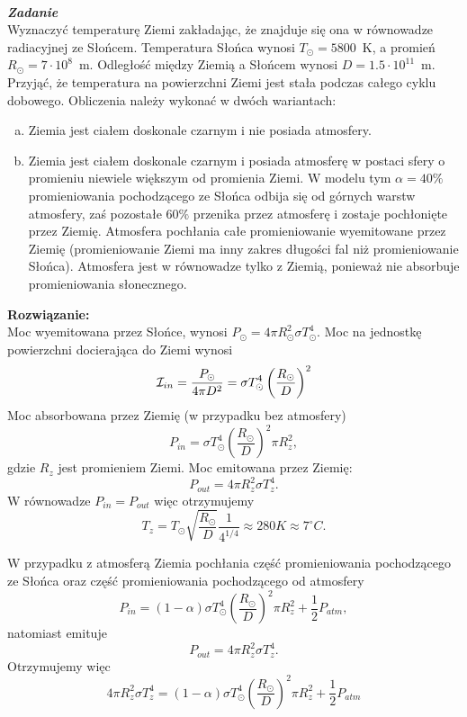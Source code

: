 \documentclass[11pt,a4paper]{article}
\newcounter{zadanie}\newcommand{\zadanie}[1][]{\addtocounter{zadanie}{1} ~\\  {\bf \emph{Zadanie \arabic{zadanie} #1 }} \\}
\begin{document}
\newpage
\zadanie

Wyznaczyć temperaturę Ziemi zakładając, że znajduje się ona w równowadze radiacyjnej ze
Słońcem. Temperatura Słońca wynosi $T_\odot = 5800$~K, a promień $R_\odot = 7 \cdot 10^8$~m.
Odległość między Ziemią a Słońcem wynosi $D = 1.5 \cdot 10^{11}$~m. 
Przyjąć, że temperatura na powierzchni Ziemi jest stała podczas całego cyklu dobowego.
Obliczenia należy wykonać w dwóch wariantach:\\
\begin{enumerate}[a)]
        \item Ziemia jest ciałem doskonale czarnym i nie posiada atmosfery.
        \item Ziemia jest ciałem doskonale czarnym i posiada atmosferę w postaci sfery o promieniu niewiele większym od promienia Ziemi. 
        W modelu tym $\alpha=40\%$ promieniowania pochodzącego ze Słońca odbija się od górnych warstw atmosfery, zaś pozostałe $60\%$ 
        przenika przez atmosferę i zostaje pochłonięte przez Ziemię. Atmosfera pochłania całe promieniowanie wyemitowane przez Ziemię
  (promieniowanie Ziemi ma inny zakres długości fal niż promieniowanie Słońca). Atmosfera jest w równowadze tylko z Ziemią, 
  ponieważ nie absorbuje promieniowania słonecznego.
\end{enumerate}

\vskip 10pt
\textbf{Rozwiązanie:}\\
Moc wyemitowana przez Słońce, wynosi
$P_\odot = 4\pi R_\odot^2 \sigma T_\odot^4 $. Moc na jednostkę powierzchni docierająca
do Ziemi wynosi 
$$
{\cal I}_{in} = \frac{P_\odot}{ 4\pi D^2} =  \sigma T_\odot^4 \left(\frac{R_\odot}{D}\right)^2
$$
Moc absorbowana przez Ziemię (w przypadku bez atmosfery)
$$
P_{in} =  \sigma T_\odot^4 \left(\frac{R_\odot}{D}\right)^2 \pi R_z ^2,
$$
gdzie $R_z$ jest promieniem Ziemi.
Moc emitowana przez Ziemię:
$$
P_{out} = 4\pi R_z^2 \sigma T_z^4.
$$
W równowadze $P_{in}=P_{out}$ więc otrzymujemy
$$
T_z = T_\odot \sqrt{\frac{R_\odot}{ D}}\frac{1}{4^{1/4}} \approx 280 K \approx 7^\circ C.
$$

W przypadku z atmosferą 
Ziemia pochłania część promieniowania pochodzącego ze Słońca oraz część promieniowania 
pochodzącego od atmosfery 
$$
P_{in} = (1-\alpha)\sigma T_\odot^4 \left(\frac{R_\odot}{D}\right)^2 \pi R_z ^2
+ \frac{1}{2} P_{atm},
$$
natomiast emituje
$$
P_{out} = 4\pi R_z^2 \sigma T_z^4.
$$
Otrzymujemy więc
$$
4\pi R_z^2 \sigma T_z^4 = (1-\alpha)\sigma T_\odot^4 \left(\frac{R_\odot}{D}\right)^2 \pi R_z ^2
+ \frac{1}{2} P_{atm}
$$
\end{document}
